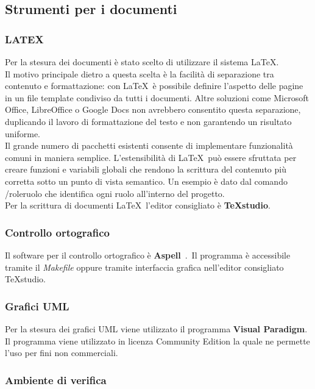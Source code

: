 \subsection{Strumenti per i documenti}
\subsubsection{LATEX} 
 
Per la stesura dei documenti è stato scelto di utilizzare il sistema \LaTeX.\\
Il motivo 
principale dietro a questa scelta è la facilità di separazione tra contenuto e formattazione: 
con \LaTeX\ è possibile definire l’aspetto delle pagine in un file template condiviso da tutti i documenti. Altre soluzioni come Microsoft Office, LibreOffice o Google Docs non 
avrebbero consentito questa separazione, duplicando il lavoro di formattazione del testo 
e non garantendo un risultato uniforme.\\
Il grande numero di pacchetti esistenti consente di implementare funzionalità comuni 
in maniera semplice. L’estensibilità di \LaTeX\ può essere sfruttata per creare funzioni e 
variabili globali che rendono la scrittura del contenuto più corretta sotto un punto di 
vista semantico. Un esempio è dato dal comando /role{ruolo} che identifica ogni ruolo 
all’interno del progetto.\\
Per la scrittura di documenti \LaTeX\  l’editor consigliato è \textbf{TeXstudio}. 

\subsubsection{Controllo ortografico}

Il software per il controllo ortografico è \textbf{Aspell}\ .\ Il programma è accessibile tramite il \emph{Makefile} oppure tramite interfaccia grafica nell’editor consigliato TeXstudio.


\subsubsection{Grafici UML} 

Per la stesura dei grafici UML viene utilizzato il programma \textbf{Visual Paradigm}. Il programma viene utilizzato in licenza Community Edition la quale ne permette l’uso per fini non commerciali.



\subsubsection{Ambiente di verifica}

